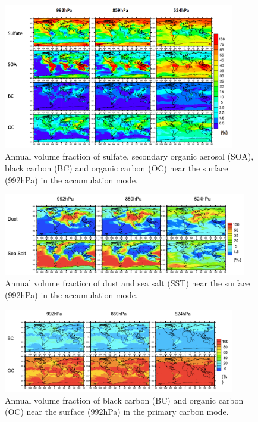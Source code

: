 \documentclass[12pt, fullpage]{uiucthesis2009}
\begin{document}
		\begin{figure}[h] 
			\begin{center}
				\includegraphics[width = 0.9\textwidth]{Figure29}
				\caption[Annual volume fraction of sulfate, secondary organic aerosol (SOA), black carbon (BC) and organic carbon (OC) near the surface (992hPa) in the accumulation mode]{\label{fig_P29} Annual volume fraction of sulfate, secondary organic aerosol (SOA), black carbon (BC) and organic carbon (OC) near the surface (992hPa) in the accumulation mode.}
			\end{center}
		\end{figure}
			\begin{figure}[h] 
				\begin{center}
					\includegraphics[width = 0.95\textwidth]{Figure30}
					\caption[Annual volume fraction of dust and sea salt (SST) near the surface (992hPa) in the accumulation mode]{\label{fig_P30} Annual volume fraction of dust and sea salt (SST) near the surface (992hPa) in the accumulation mode.}
				\end{center}
			\end{figure}
				\begin{figure}[h] 
					\begin{center}
						\includegraphics[width = 0.9\textwidth]{Figure31}
						\caption[Annual volume fraction of black carbon (BC) and organic carbon (OC) near the surface (992hPa) in the primary carbon mode]{\label{fig_P31} Annual volume fraction of black carbon (BC) and organic carbon (OC) near the surface (992hPa) in the primary carbon mode.}
					\end{center}
				\end{figure}
\end{document}
